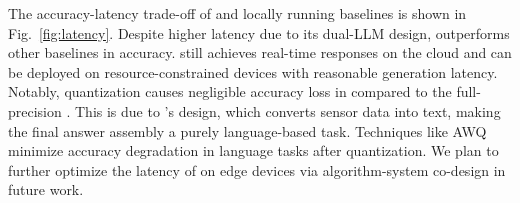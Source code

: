 The accuracy-latency trade-off of \Method and locally running baselines is shown in Fig.~\ref{fig:latency}. Despite higher latency due to its dual-LLM design, \Method outperforms other baselines in accuracy. \Method still achieves real-time responses on the cloud and can be deployed on resource-constrained devices with reasonable generation latency.
Notably, quantization causes negligible accuracy loss in \MethodE compared to the full-precision \MethodC. This is due to \Method's design, which converts sensor data into text, making the final answer assembly a purely language-based task. Techniques like AWQ~\cite{lin2023awq} minimize accuracy degradation in language tasks after quantization.
We plan to further optimize the latency of \Method on edge devices via algorithm-system co-design in future work.



\iffalse
\begin{figure*}[tb]
  \centering
  \begin{subfigure}[b]{0.44\textwidth}
        \centering
        \texttt{[image: figs/memory.png]} 
        \vspace{-4mm}
        \caption{Memory requirements of quantized and unquantized models from various methods. The red horizontal line shows the RAM size limit of 8GB on Jetson TX2~\cite{jetsontx2}.}
        \label{fig:memory}
    \end{subfigure} \hspace{0.02\textwidth} %
    \begin{subfigure}[b]{0.44\textwidth}
        \centering
        \texttt{[image: figs/efficiency.png]} 
        \vspace{-4mm}
        \caption{Efficiency of fine-tuning methods on desktop and Jetson TX2~\cite{jetsontx2}. The footnote $Q$ indicates quantized models.}
        \label{fig:efficiency}
    \end{subfigure}
  \vspace{-4mm}
  \caption{\textcolor{red}{To be updated.}}
  \vspace{-6mm}
  \label{fig:qual_results}
\end{figure*}
\fi





